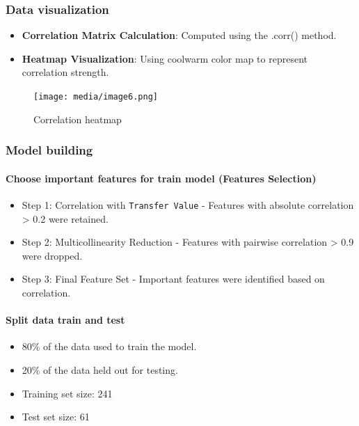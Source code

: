 \documentclass[12pt,a4paper]{report}
\begin{document}
\subsubsection{Data visualization}
\begin{itemize}
    \item \textbf{Correlation Matrix Calculation}: Computed using the .corr() method.
    \item \textbf{Heatmap Visualization}: Using coolwarm color map to represent correlation strength.
\end{itemize}

\begin{figure}[H]
    \centering
    \texttt{[image: media/image6.png]}
    \caption{Correlation heatmap}
\end{figure}

\subsubsection{Model building}
\paragraph{Choose important features for train model (Features Selection)}
\begin{itemize}
    \item Step 1: Correlation with \texttt{Transfer Value} - Features with absolute correlation > 0.2 were retained.
    \item Step 2: Multicollinearity Reduction - Features with pairwise correlation > 0.9 were dropped.
    \item Step 3: Final Feature Set - Important features were identified based on correlation.
\end{itemize}

\paragraph{Split data train and test}
\begin{itemize}
    \item 80\% of the data used to train the model.
    \item 20\% of the data held out for testing.
    \item Training set size: 241
    \item Test set size: 61
\end{itemize}
\end{document}
